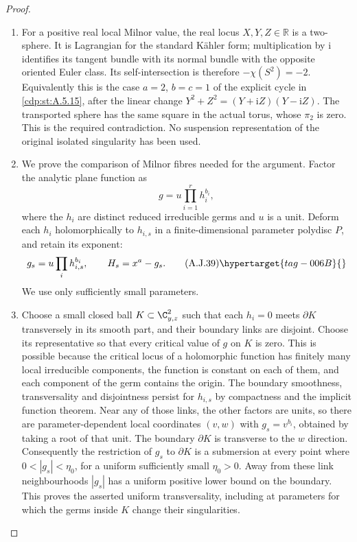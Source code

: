 \begin{proof}
\begin{enumerate}[label={$\langle1\rangle$\arabic*.},leftmargin=*]
\item For a positive real local Milnor value, the real
locus $X,Y,Z\in\mathbb R$ is a two-sphere. It is
Lagrangian for the standard K\"ahler form; multiplication
by $\mathrm i$ identifies its tangent bundle with
its normal bundle with the opposite oriented Euler
class. Its self-intersection is therefore
$-\chi(S^2)=-2$. Equivalently this is the case
$a=2$, $b=c=1$ of the explicit cycle in \ref{cdp:st:A.5.15},
after the linear change $Y^2+Z^2=(Y+\mathrm iZ)(Y-\mathrm iZ)$.
The transported sphere has the same square in the
actual torus, whose $\pi_2$ is zero. This is the
required contradiction. No suspension representation
of the original isolated singularity has been used.

\item We prove the comparison of Milnor fibres needed for
the argument. Factor the analytic plane function as
\[
                   g=u\prod_{i=1}^r h_i^{b_i},
\]
where the $h_i$ are distinct reduced irreducible
germs and $u$ is a unit. Deform each $h_i$
holomorphically to $h_{i,s}$ in a finite-dimensional
parameter polydisc $P$, and retain its exponent:
\[
 g_s=u\prod_i h_{i,s}^{b_i},\qquad
 H_s=x^a-g_s.                                    \tag{A.J.39}\hypertarget{tag-006B}{}\label{cdp:eq:A.J.39}
\]
We use only sufficiently small parameters.

\item Choose a small closed ball $K\subset\C^2_{y,z}$
such that each $h_i=0$ meets $\partial K$
transversely in its smooth part, and their boundary
links are disjoint. Choose its representative so
that every critical value of $g$ on $K$ is zero.
This is possible because the critical locus of a
holomorphic function has finitely many local
irreducible components, the function is constant
on each of them, and each component of the germ
contains the origin. The boundary smoothness,
transversality and disjointness persist for
$h_{i,s}$ by compactness and the implicit function
theorem. Near any of those links, the other factors
are units, so there are parameter-dependent local
coordinates $(v,w)$ with $g_s=v^{b_i}$, obtained
by taking a root of that unit. The boundary
$\partial K$ is transverse to the $w$ direction.
Consequently the restriction of $g_s$ to
$\partial K$ is a submersion at every point where
$0<|g_s|<\eta_0$, for a uniform sufficiently small
$\eta_0>0$. Away from these link neighbourhoods
$|g_s|$ has a uniform positive lower bound on the
boundary. This proves the asserted uniform
transversality, including at parameters for which
the germs inside $K$ change their singularities.


\end{enumerate}
\end{proof}
